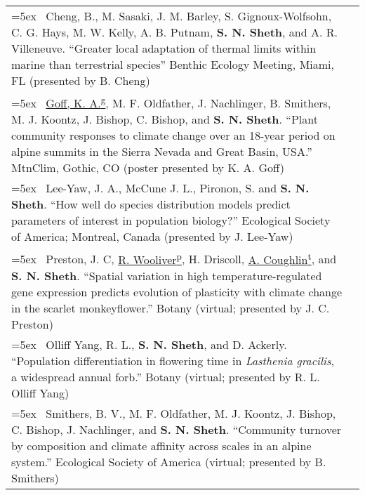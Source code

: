 \documentclass[11pt,english]{article}\usepackage[]{graphicx}\usepackage[]{xcolor}
\providecommand{\tabularnewline}{\\}
\begin{document}
\begin{tabularx}{\textwidth}{@{}>{\raggedright}p{5.25in} >{\raggedleft}X@{}}
\hangindent=5ex \ Cheng, B., M. Sasaki, J. M. Barley, S. Gignoux-Wolfsohn, C. G. Hays, M. W. Kelly, A. B. Putnam, \textbf{S. N. Sheth}, and A. R. Villeneuve. ``Greater local adaptation of thermal limits within marine than terrestrial species'' Benthic Ecology Meeting, Miami, FL (presented by B. Cheng) & 2023 \tabularnewline

\hangindent=5ex \ \underline{Goff, K. A.\textsuperscript{g}}, M. F. Oldfather, J. Nachlinger, B. Smithers, M. J. Koontz, J. Bishop, C. Bishop, and \textbf{S. N. Sheth}. ``Plant community responses to climate change over an 18-year period on alpine summits in the Sierra Nevada and Great Basin, USA.'' MtnClim, Gothic, CO (poster presented by K. A. Goff) & 2022 \tabularnewline

\hangindent=5ex \ Lee-Yaw, J. A., McCune J. L., Pironon, S. and \textbf{S. N. Sheth}. ``How well do species distribution models predict parameters of interest in population biology?'' Ecological Society of America; Montreal, Canada (presented by J. Lee-Yaw) & 2022 \tabularnewline

\hangindent=5ex \ Preston, J. C, \underline{R. Wooliver\textsuperscript{p}}, H. Driscoll, \underline{A. Coughlin\textsuperscript{t}}, and \textbf{S. N. Sheth}. ``Spatial variation in high temperature-regulated gene expression predicts evolution of plasticity with climate change in the scarlet monkeyflower.'' Botany (virtual; presented by J. C. Preston) & 2021 \tabularnewline

\hangindent=5ex \ Olliff Yang, R. L., \textbf{S. N. Sheth}, and D. Ackerly. ``Population differentiation in flowering time in \emph{Lasthenia gracilis}, a widespread annual forb.'' Botany (virtual; presented by R. L. Olliff Yang) & 2021 \tabularnewline

\hangindent=5ex \ Smithers, B. V., M. F. Oldfather, M. J. Koontz, J. Bishop, C. Bishop, J. Nachlinger, and \textbf{S. N. Sheth}. ``Community turnover by composition and climate affinity across scales in an alpine system.'' Ecological Society of America (virtual; presented by B. Smithers) & 2020 \tabularnewline

\end{tabularx}

\renewcommand{\arraystretch}{1.2}
\end{document}
